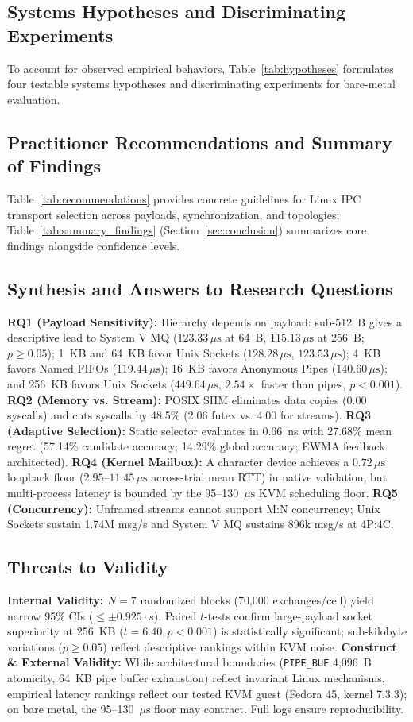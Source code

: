 \subsection{Systems Hypotheses and Discriminating Experiments}

To account for observed empirical behaviors, Table~\ref{tab:hypotheses} formulates four testable systems hypotheses and discriminating experiments for bare-metal evaluation.

\subsection{Practitioner Recommendations and Summary of Findings}

Table~\ref{tab:recommendations} provides concrete guidelines for Linux IPC transport selection across payloads, synchronization, and topologies; Table~\ref{tab:summary_findings} (Section~\ref{sec:conclusion}) summarizes core findings alongside confidence levels.

\subsection{Synthesis and Answers to Research Questions}
\textbf{RQ1 (Payload Sensitivity):} Hierarchy depends on payload: sub-512~B gives a descriptive lead to System V MQ ($123.33\,\mu\text{s}$ at 64~B, $115.13\,\mu\text{s}$ at 256~B; $p \ge 0.05$); 1~KB and 64~KB favor Unix Sockets ($128.28\,\mu\text{s}$, $123.53\,\mu\text{s}$); 4~KB favors Named FIFOs ($119.44\,\mu\text{s}$); 16~KB favors Anonymous Pipes ($140.60\,\mu\text{s}$); and 256~KB favors Unix Sockets ($449.64\,\mu\text{s}$, $2.54\times$ faster than pipes, $p < 0.001$).
\textbf{RQ2 (Memory vs. Stream):} POSIX SHM eliminates data copies (0.00 syscalls) and cuts syscalls by 48.5\% (2.06 futex vs. 4.00 for streams).
\textbf{RQ3 (Adaptive Selection):} Static selector evaluates in 0.66~ns with 27.68\% mean regret (57.14\% candidate accuracy; 14.29\% global accuracy; EWMA feedback architected).
\textbf{RQ4 (Kernel Mailbox):} A character device achieves a $0.72\,\mu\text{s}$ loopback floor ($2.95\text{--}11.45\,\mu\text{s}$ across-trial mean RTT) in native validation, but multi-process latency is bounded by the 95--130~$\mu\text{s}$ KVM scheduling floor.
\textbf{RQ5 (Concurrency):} Unframed streams cannot support M:N concurrency; Unix Sockets sustain 1.74M msg/s and System V MQ sustains 896k msg/s at 4P:4C.

\subsection{Threats to Validity}
\textbf{Internal Validity:} $N = 7$ randomized blocks (70,000 exchanges/cell) yield narrow 95\% CIs ($\le \pm 0.925 \cdot s$). Paired $t$-tests confirm large-payload socket superiority at 256~KB ($t=6.40, p < 0.001$) is statistically significant; sub-kilobyte variations ($p \ge 0.05$) reflect descriptive rankings within KVM noise.
\textbf{Construct \& External Validity:} While architectural boundaries (\texttt{PIPE\_BUF} 4,096~B atomicity, 64~KB pipe buffer exhaustion) reflect invariant Linux mechanisms, empirical latency rankings reflect our tested KVM guest (Fedora 45, kernel 7.3.3); on bare metal, the 95--130~$\mu$s floor may contract. Full logs ensure reproducibility.
